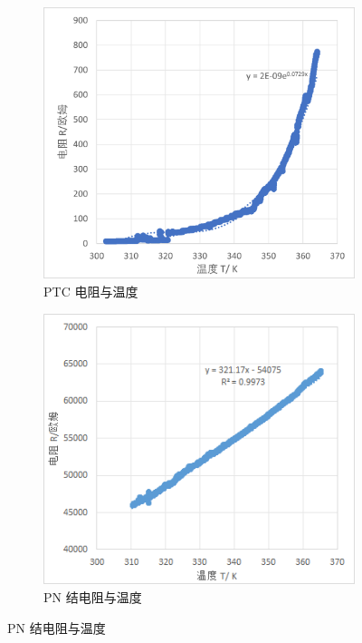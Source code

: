 \documentclass[a4paper]{../phyreport}
\begin{document}
\begin{figure}[H]
\begin{subfigure}{.3\textwidth}
    \includegraphics[width=\linewidth]{测量水比热/PTC.png}
    \caption[]{\label{fig:pnR} PTC 电阻与温度}
  \end{subfigure}\hfil
\begin{subfigure}{.3\textwidth}
\includegraphics[width=\linewidth]{测量水比热/20240508152249.png}
\caption[]{\label{fig:pnR} PN 结电阻与温度}
\end{subfigure}
\end{figure}
\end{document}
